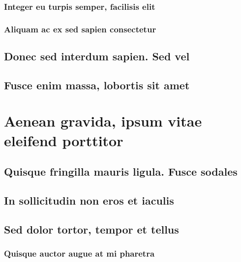 \documentclass[%
  bachelor,%
  english%
  oneside,%
  debug,%
]{student}
\begin{document}
\lipsum[1-8]

\subsubsection{Integer eu turpis semper, facilisis elit}

\lipsum[1-8]

\subsubsection{Aliquam ac ex sed sapien consectetur}

\lipsum[1-8]

\subsection{Donec sed interdum sapien. Sed vel}

\lipsum[1-8]

\subsection{Fusce enim massa, lobortis sit amet}

\lipsum[1-8]

\section{Aenean gravida, ipsum vitae eleifend porttitor}

\lipsum[1-8]

\subsection{Quisque fringilla mauris ligula. Fusce sodales}

\lipsum[1-8]

\subsection{In sollicitudin non eros et iaculis}

\lipsum[1-8]

\subsection{Sed dolor tortor, tempor et tellus}

\lipsum[1-8]

\subsubsection{Quisque auctor augue at mi pharetra}
\end{document}
